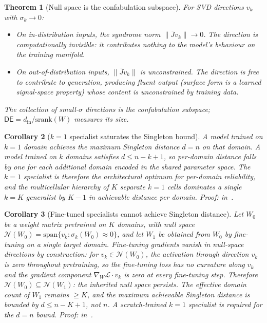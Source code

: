 \documentclass[11pt,a4paper]{article}
\newtheorem{theorem}{Theorem}[section]
\newtheorem{corollary}[theorem]{Corollary}
\newcommand{\DE}{\mathsf{DE}}
\newcommand{\srank}{\mathrm{srank}}
\newcommand{\Jbar}{\bar{J}}
\newcommand{\Norm}{\mathcal{N}}
\begin{document}
\begin{theorem}[Null space is the confabulation subspace]
\label{thm:null}
For SVD directions $v_k$ with $\sigma_k \to 0$:
\begin{itemize}[nosep]
  \item On in-distribution inputs, the syndrome norm $\|\Jbar v_k\| \to 0$. The direction is computationally invisible: it contributes nothing to the model's behaviour on the training manifold.
  \item On out-of-distribution inputs, $\|\Jbar v_k\|$ is unconstrained. The direction is free to contribute to generation, producing fluent output (surface form is a learned signal-space property) whose content is unconstrained by training data.
\end{itemize}
The collection of small-$\sigma$ directions is the confabulation subspace; $\DE = d_{\mathrm{in}} / \srank(W)$ measures its size.
\end{theorem}

\begin{corollary}[$k = 1$ specialist saturates the Singleton bound]
\label{fix:cor1}
A model trained on $k = 1$ domain achieves the maximum Singleton distance $d = n$ on that domain. A model trained on $k$ domains satisfies $d \leq n - k + 1$, so per-domain distance falls by one for each additional domain encoded in the shared parameter space. The $k = 1$ specialist is therefore the architectural optimum for per-domain reliability, and the multicellular hierarchy of $K$ separate $k = 1$ cells dominates a single $k = K$ generalist by $K - 1$ in achievable distance per domain. Proof: in~\cite{SyndromeAlgebra}.
\end{corollary}
 
\begin{corollary}[Fine-tuned specialists cannot achieve Singleton distance]
\label{fix:cor2}
Let $W_0$ be a weight matrix pretrained on $K$ domains, with null space $\Norm(W_0) = \mathrm{span}\{v_k : \sigma_k(W_0) \approx 0\}$, and let $W_1$ be obtained from $W_0$ by fine-tuning on a single target domain. Fine-tuning gradients vanish in null-space directions by construction: for $v_k \in \Norm(W_0)$, the activation through direction $v_k$ is zero throughout pretraining, so the fine-tuning loss has no curvature along $v_k$ and the gradient component $\nabla_W \mathcal{L} \cdot v_k$ is zero at every fine-tuning step. Therefore $\Norm(W_0) \subseteq \Norm(W_1)$: the inherited null space persists. The effective domain count of $W_1$ remains $\geq K$, and the maximum achievable Singleton distance is bounded by $d \leq n - K + 1$, not $n$. A scratch-trained $k = 1$ specialist is required for the $d = n$ bound. Proof: in~\cite{SyndromeAlgebra}.
\end{corollary}
\end{document}

